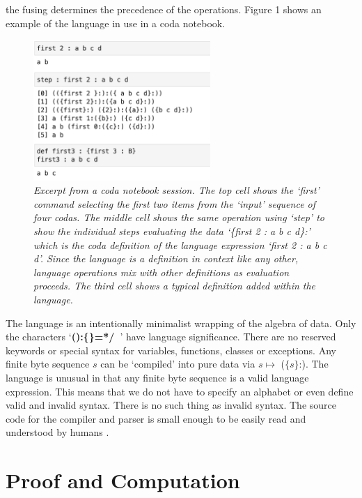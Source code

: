 \documentclass[11pt]{article}
\begin{document}
the fusing determines the precedence of the operations.  Figure 1 shows an example of the language in use in a coda notebook\cite{github}.
\begin{figure}[h]
\centering
\includegraphics[width=0.6\textwidth]{fig1.png}
\caption{{\it Excerpt from a coda notebook session.  The top cell shows the `first' command selecting the first two items from the `input'
sequence of four codas.  The middle cell shows the same operation using `step' to  show the individual steps evaluating the
data `\{first 2 : a b c d\}:' which is the coda definition of the language expression `first 2 : a b c d'.  Since the language is a definition
in context like any other, language operations mix with other definitions as evaluation proceeds.  The third cell shows a typical definition added within the language.}}
\end{figure}

     The language is an intentionally minimalist wrapping of the algebra of data.
Only the characters `{\bf():\{\}=*/\ }' have language significance.  There are no reserved keywords or
special syntax for variables, functions, classes or exceptions.  Any finite byte sequence $s$ can be `compiled' into pure data via $s \mapsto$ ($\{s\}$:).  
The language is unusual in that any finite byte sequence is a valid language expression.
This means that we do not have to specify an alphabet or even define valid and invalid syntax.  There is no such thing
as invalid syntax.  The source code for the compiler and parser is small enough to be easily read and understood by
humans \cite{github}.

\section{Proof and Computation}
\end{document}
